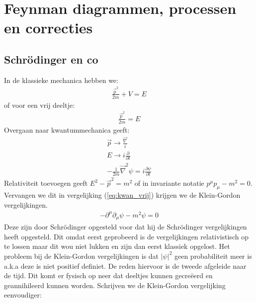 \documentclass[../main.tex]{subfiles}
\begin{document}
\section{Feynman diagrammen, processen en correcties}%
\label{sec:feynman_diagrammen_processen_en_correcties}

\subsection{Schrödinger en co}%
\label{sub:schrodinger_en_co}

In de klassieke mechanica hebben we:
\begin{equation}
    \begin{aligned}
        \label{eq:klas_mech}
        \frac{\vec{p}^2}{2m} +V=E
    \end{aligned}
\end{equation}
of voor een vrij deeltje:
\begin{equation}
    \begin{aligned}
        \label{eq:klas_vrij}
        \frac{\vec{p}^2}{2m}=E
    \end{aligned}
\end{equation}
Overgaan naar kwantummechanica geeft:
\begin{equation}
    \begin{aligned}
        \label{eq:kwan_vrij}
        \vec{p}\rightarrow \frac{\vec{\nabla}}{i} \\
        E \rightarrow i \frac{\partial}{\partial t} \\
        - \frac{1}{2m} \vec{\nabla}^2\psi = i \frac{\partial \psi}{\partial t} 
    \end{aligned}
\end{equation}
Relativiteit toevoegen geeft $E^2-\vec{p}^2=m^2$ of in invariante notatie $p^\mu p_\mu-m^2=0$. Vervangen we dit in vergelijking (\ref{eq:kwan_vrij}) krijgen we de Klein-Gordon vergelijkingen.
\begin{equation}
    \begin{aligned}
        \label{eq:klein_gordon}
        -\partial^\mu\partial_\mu \psi - m^2\psi = 0
    \end{aligned}
\end{equation}
Deze zijn door Schrödinger opgesteld voor dat hij de Schrödinger vergelijkingen heeft opgesteld. Dit omdat eerst geprobeerd is de vergelijkingen relativistisch op te lossen maar dit wou niet lukken en zijn dan eerst klassiek opgelost. Het probleem bij de Klein-Gordon vergelijkingen is dat $|\psi|^2$ geen probabiliteit meer is a.k.a deze is niet positief definiet. De reden hiervoor is de tweede afgeleide naar de tijd. Dit komt er fysisch op neer dat deeltjes kunnen gecreëerd en geannihileerd kunnen worden. Schrijven we de Klein-Gordon vergelijking eenvoudiger:
\end{document}
